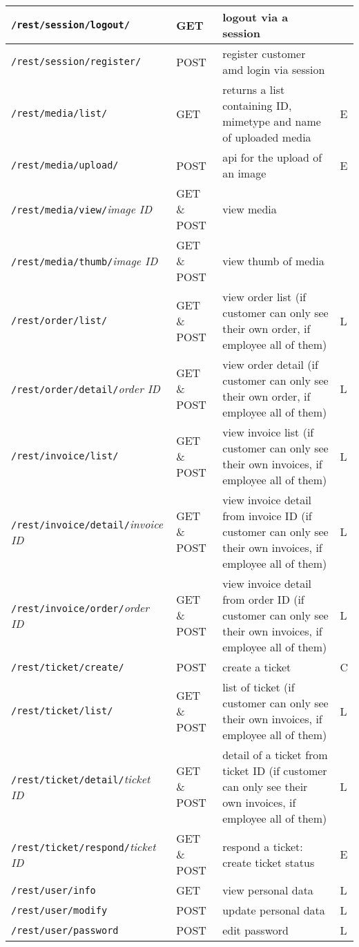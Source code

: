 \begin{longtable}{|p{}|p{} |p{}|p{}|}
\texttt{/rest/session/logout/} & GET & logout via a session &  \\\hline
\texttt{/rest/session/register/} & POST & register customer amd login via session &  \\\hline
\texttt{/rest/media/list/} & GET & returns a list containing ID, mimetype and name of uploaded media & E\\\hline
\texttt{/rest/media/upload/} & POST &  api for the upload of an image & E\\\hline
\texttt{/rest/media/view/}\textit{image ID} & GET \& POST &  view media &  \\\hline
\texttt{/rest/media/thumb/}\textit{image ID} & GET \& POST & view thumb of media &  \\\hline
\texttt{/rest/order/list/} & GET \& POST & view order list (if customer can only see their own order, if employee all of them) & L\\\hline
\texttt{/rest/order/detail/}\textit{order ID} & GET \& POST & view order detail (if customer can only see their own order, if employee all of them) & L\\\hline
\texttt{/rest/invoice/list/} & GET \& POST & view invoice list (if customer can only see their own invoices, if employee all of them) & L\\\hline
\texttt{/rest/invoice/detail/}\textit{invoice ID} & GET \& POST & view invoice detail from invoice ID (if customer can only see their own invoices, if employee all of them) & L\\\hline
\texttt{/rest/invoice/order/}\textit{order ID} & GET \& POST & view invoice detail from order ID (if customer can only see their own invoices, if employee all of them) & L\\\hline
\texttt{/rest/ticket/create/} & POST  & create a ticket & C \\\hline
\texttt{/rest/ticket/list/} & GET \& POST  & list of ticket (if customer can only see their own invoices, if employee all of them) & L \\\hline
\texttt{/rest/ticket/detail/}\textit{ticket ID} & GET \& POST & detail of a ticket from ticket ID (if customer can only see their own invoices, if employee all of them) & L \\\hline
\texttt{/rest/ticket/respond/}\textit{ticket ID} & GET \& POST & respond a ticket: create ticket status & E \\\hline
\texttt{/rest/user/info} & GET & view personal data & L \\\hline
\texttt{/rest/user/modify} & POST & update personal data & L\\\hline
\texttt{/rest/user/password} & POST & edit password & L\\\hline


\end{longtable}
